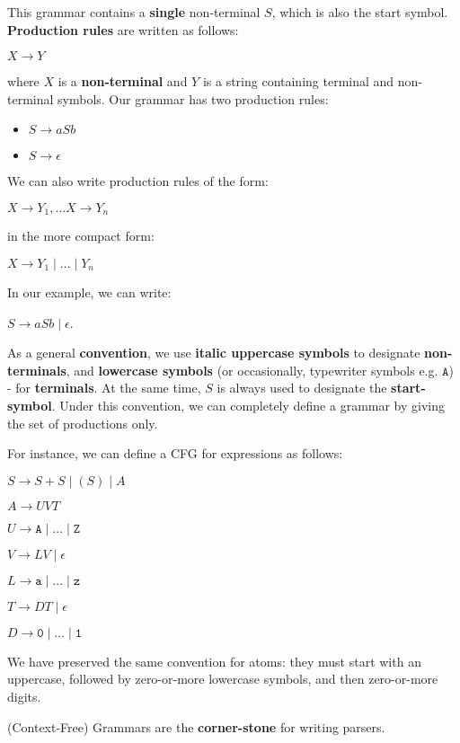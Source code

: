 \documentclass[a4paper, 12pt]{article}
\begin{document}
This grammar contains a \textbf{single} non-terminal $S$, which is also the start symbol. \textbf{Production rules} are written as follows:

$\displaystyle X \rightarrow Y$

where $X$ is a \textbf{non-terminal} and $Y$ is a string containing terminal and non-terminal symbols. Our grammar has two production rules:
  \begin{itemize}
  	\item  $S\rightarrow aSb$
  	\item  $S\rightarrow \epsilon$
  \end{itemize}

We can also write production rules of the form:

$\displaystyle X \rightarrow Y_1, \ldots X \rightarrow Y_n $

in the more compact form:

$\displaystyle X \rightarrow Y_1 \mid \ldots \mid Y_n $

In our example, we can write:

$S\rightarrow aSb \mid \epsilon$.

As a general \textbf{convention}, we use \textbf{italic uppercase symbols} to designate \textbf{non-terminals}, and \textbf{lowercase symbols} (or occasionally, typewriter symbols e.g. $\texttt{A}$) - for \textbf{terminals}. At the same time, $S$ is always used to designate the \textbf{start-symbol}. Under this convention, we can completely define a grammar by giving the set of productions only. 

For instance, we can define a CFG for expressions as follows:

$S \rightarrow S + S \mid (S) \mid A$

$A \rightarrow UVT$

$U \rightarrow \texttt{A} \mid \ldots \mid \texttt{Z}$

$V \rightarrow LV \mid \epsilon$

$L \rightarrow \texttt{a} \mid \ldots \mid \texttt{z}$

$T \rightarrow DT \mid \epsilon$

$D \rightarrow \texttt{0} \mid \ldots \mid \texttt{1}$

We have preserved the same convention for atoms: they must start with an uppercase, followed by zero-or-more lowercase symbols, and then zero-or-more digits.

(Context-Free) Grammars are the \textbf{corner-stone} for writing parsers.
\end{document}
